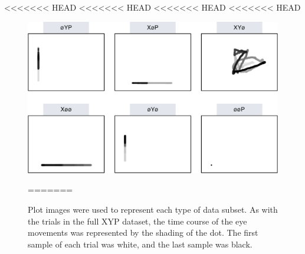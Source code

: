 \documentclass[
  english,
  man, donotrepeattitle,floatsintext]{apa6}
\begin{document}
<<<<<<< HEAD
<<<<<<< HEAD
<<<<<<< HEAD
<<<<<<< HEAD
\begin{figure}
\centering
\includegraphics{figures/subset_imgs.pdf}
\caption{\label{fig:ave-subset}Plot images were used to represent each type of data subset. As with the trials in the full XYP dataset, the time course of the eye movements was represented by the shading of the dot. The first sample of each trial was white, and the last sample was black.}
=======



\end{figure}
\end{document}
